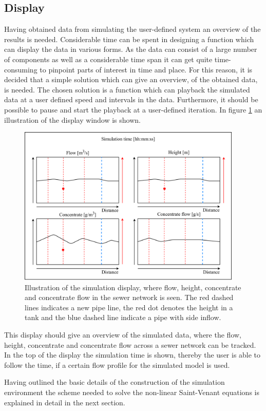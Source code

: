 \subsection*{Display}

Having obtained data from simulating the user-defined system an overview of the results is needed. Considerable time can be spent in designing a function which can display the data in various forms. As the data can consist of a large number of components as well as a considerable time span it can get quite time-consuming to pinpoint parts of interest in time and place. For this reason, it is decided that a simple solution which can give an overview, of the obtained data, is needed. The chosen solution is a function which can playback the simulated data at a user defined speed and intervals in the data. Furthermore, it should be possible to pause and start the playback at a user-defined iteration. In figure \ref{fig:display_results} an illustration of the display window is shown.   

\begin{figure}[H]
	\centering
	\includegraphics[width=0.95\textwidth]{report/simulation/pictures/display_results}
	\caption{Illustration of the simulation display, where flow, height, concentrate and concentrate flow in the sewer network is seen. The red dashed lines indicates a new pipe line, the red dot denotes the height in a tank and the blue dashed line indicate a pipe with side inflow.}
	\label{fig:display_results}
\end{figure}

This display should give an overview of the simulated data, where the flow, height, concentrate and concentrate flow across a sewer network can be tracked. In the top of the display the simulation time is shown, thereby the user is able to follow the time, if a certain flow profile for the simulated model is used. 

Having outlined the basic details of the construction of the simulation environment the scheme needed to solve the non-linear Saint-Venant equations is explained in detail in the next section. 